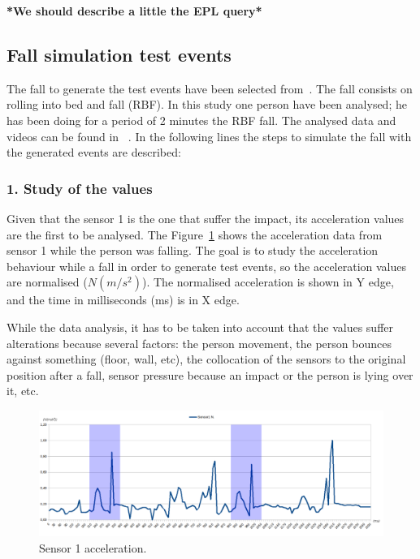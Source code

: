 \documentclass[conference]{IEEEtran}
\theoremstyle{definition}
\begin{document}
\textbf{*We should describe a little the EPL query*}
 
\subsection{Fall simulation test events} %

The fall to generate the test events have been selected from~\cite{Li2009,Pannurat2014}. The fall consists on rolling into bed and fall (RBF).
In this study one person have been analysed; he has been doing for a period of 2 minutes the RBF fall. The analysed 
data and videos can be found in ~\cite{}. In the following lines the steps to simulate the fall with the generated events are described:

\subsubsection*{1. Study of the values} Given that the sensor 1 is the one that suffer the impact, its acceleration values are the first
to be analysed. The Figure~\ref{fig:Sensor1Sombras} shows the acceleration data from sensor 1 while the person was falling. 
The goal is to study the acceleration behaviour while a fall in order to generate test events, so the acceleration values are 
normalised ($N(m/s^2)$). The normalised acceleration is shown in Y edge, and the time in milliseconds (ms) is in X edge.

While the data analysis, it has to be taken into account that the values suffer alterations because several factors: 
the person movement, the person bounces against something (floor, wall, etc), the collocation of the sensors to the 
original position after a fall, sensor pressure because an impact or the person is lying over it, etc.

 \begin{figure}[!h]
  \includegraphics[scale=0.375]{Sensor1Sombras}
  \caption[Sensor 1 acceleration]{Sensor 1 acceleration.}
  \label{fig:Sensor1Sombras}
\end{figure}
\end{document}
